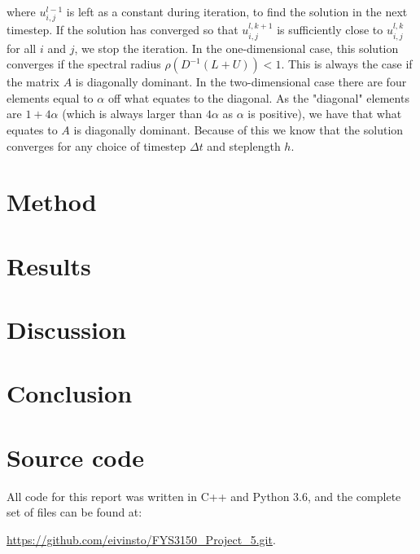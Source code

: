 \documentclass[reprint,english,notitlepage]{revtex4-1}  %
\begin{document}
where $u_{i,j}^{l-1}$ is left as a constant during iteration, to find the solution in the next timestep. If the solution has converged so that $u_{i,j}^{l,k+1}$ is sufficiently close to $u_{i,j}^{l,k}$ for all $i$ and $j$, we stop the iteration. In the one-dimensional case, this solution converges if the spectral radius $\rho(D^{-1}(L+U)) < 1$. This is always the case if the matrix $A$ is diagonally dominant. In the two-dimensional case there are four elements equal to $\alpha$ off what equates to the diagonal. As the "diagonal" elements are $1 + 4\alpha$ (which is always larger than $4\alpha$ as $\alpha$ is positive), we have that what equates to $A$ is diagonally dominant. Because of this we know that the solution converges for any choice of timestep $\Delta t$ and steplength $h$.


\clearpage

\section{Method} \label{sec:method}

\clearpage

\section{Results} \label{sec:results}

\clearpage

\section{Discussion} \label{sec:discussion}

\clearpage



\section{Conclusion} \label{sec:conclusion}

\onecolumngrid
{}
\newpage
\twocolumngrid

\appendix
\section{Source code} \label{A}
All code for this report was written in C++ and Python 3.6, and the complete set of files can be found at:

\url{https://github.com/eivinsto/FYS3150_Project_5.git}.
\end{document}
